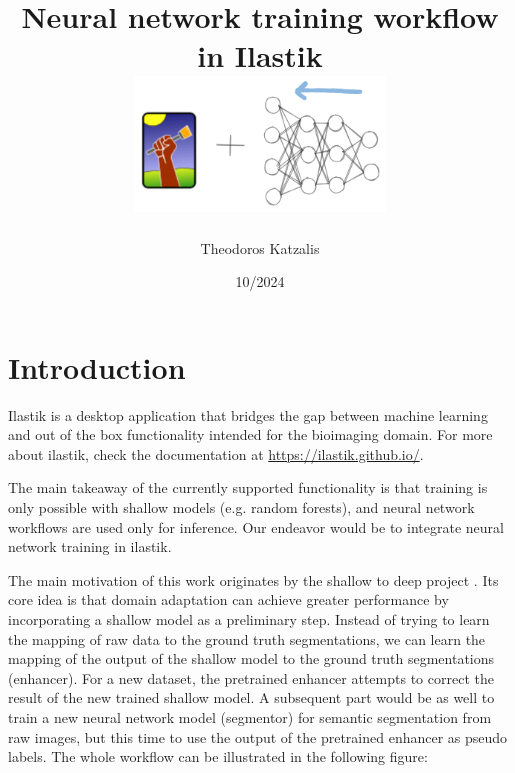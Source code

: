 \documentclass[12pt, a4paper]{article}
\begin{document}
\title{
Neural network training workflow in Ilastik\\[1cm]

\includegraphics[width=0.5\textwidth]{ilastik-logo.png}
}

\author{Theodoros Katzalis}


\date{10/2024}


\sloppy
\maketitle

{
\hypersetup{linkcolor=black}
\tableofcontents
}

\clearpage

\section{Introduction}
\label{sec:intro}

Ilastik is a desktop application that bridges the gap between machine learning and out of the box functionality intended for the bioimaging domain. For more about ilastik, check the documentation at \url{https://ilastik.github.io/}.

The main takeaway of the currently supported functionality is that training is only possible with shallow models (e.g. random forests), and neural network workflows are used only for inference. Our endeavor would be to integrate neural network training in ilastik.

The main motivation of this work originates by the shallow to deep project \cite{Matskevych2021.11.09.467925}. Its core idea is that domain adaptation can achieve greater performance by incorporating a shallow model as a preliminary step. Instead of trying to learn the mapping of raw data to the ground truth segmentations, we can learn the mapping of the output of the shallow model to the ground truth segmentations (enhancer). For a new dataset, the pretrained enhancer attempts to correct the result of the new trained shallow model. A subsequent part would be as well to train a new neural network model (segmentor) for semantic segmentation from raw images, but this time to use the output of the pretrained enhancer as pseudo labels. The whole workflow can be illustrated in the following figure:
\end{document}

